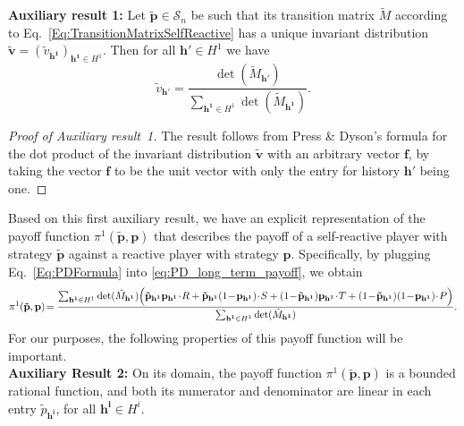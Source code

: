 \documentclass[11pt]{article}
\theoremstyle{plainCl1}
\theoremstyle{plainCl2}
\begin{document}
\noindent
{\bf Auxiliary result 1:}
Let $\mathbf{\tilde p}\!\in\!\mathcal{S}_n$ be such that its transition matrix $\tilde M$ according to Eq.~\eqref{Eq:TransitionMatrixSelfReactive} has a unique invariant distribution $\mathbf{\tilde v} \!=\! (\tilde v_\mathbf{h^1})_{\mathbf{h^1}\in H^1}$. Then for all $\mathbf{h'}\!\in\!H^1$ we have
\begin{equation} \label{Eq:PDFormula}
\tilde v_\mathbf{h'} = \frac{ \det(\tilde M_{\mathbf{h'}})}{ \sum_{\mathbf{h^1}\in H^1} \det(\tilde M_{\mathbf{h^1}})}.
\end{equation}

\begin{proof}[Proof of Auxiliary result~1]
The result follows from Press \& Dyson's formula for the dot product of the invariant distribution $\mathbf{\tilde v}$ with an arbitrary vector $\mathbf{f}$, by taking the vector $\mathbf{f}$ to be the unit vector with only the entry for history $\mathbf{h'}$ being one. 
\end{proof}

\noindent
Based on this first auxiliary result, we have an explicit representation of the payoff function $\pi^1(\mathbf{\tilde p},\mathbf{p})$ that describes the payoff of a self-reactive player with strategy $\mathbf{\tilde p}$ against a reactive player with strategy $\mathbf{p}$. 
Specifically, by plugging Eq.~\eqref{Eq:PDFormula} into \eqref{eq:PD_long_term_payoff}, we obtain
\begin{equation} \small
\pi^1(\mathbf{\tilde p},\mathbf{p}) \!=\frac{\sum_{\mathbf{h^1}\in H^1}\det(\tilde M_\mathbf{h^1})
\Big(
\mathbf{\tilde p}_\mathbf{h^1} \mathbf{p}_\mathbf{h^1}\!\cdot\!R +
\mathbf{\tilde p}_\mathbf{h^1} (1\!-\!\mathbf{p}_\mathbf{h^1})\!\cdot\!S +  
(1\!-\!\mathbf{\tilde p}_\mathbf{h^1}) \mathbf{p}_\mathbf{h^1}\!\cdot\!T +
(1\!-\!\mathbf{\tilde p}_\mathbf{h^1}) (1\!-\!\mathbf{p}_\mathbf{h^1})\!\cdot\!P 
\Big)}
{\sum_{\mathbf{h^1}\in H^1} \det(\tilde M_{\mathbf{h^1}})}.
\end{equation}
For our purposes, the following properties of this payoff function will be important.\\

\noindent
{\bf Auxiliary Result 2:}
On its domain, the payoff function $\pi^1(\mathbf{\tilde p},\mathbf{p})$ is a bounded rational function, and both its numerator and denominator are linear in each entry $\tilde p_\mathbf{h^i} $, for all $\mathbf{h^i}\!\in\!H^i$.
\end{document}

